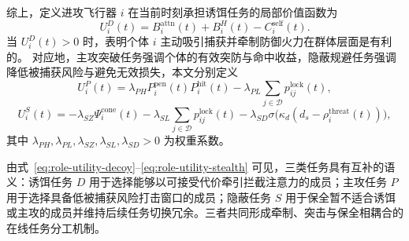 综上，定义进攻飞行器 $i$ 在当前时刻承担诱饵任务的局部价值函数为
\begin{equation}
U_i^{D}(t)
=
B_i^{\mathrm{attn}}(t)
+
B_i^{H}(t)
-
C_i^{\mathrm{self}}(t).
\label{eq:role-utility-decoy}
\end{equation}
当 $U_i^{D}(t)>0$ 时，表明个体 $i$ 主动吸引捕获并牵制防御火力在群体层面是有利的。
对应地，主攻突破任务强调个体的有效突防与命中收益，隐蔽规避任务强调降低被捕获风险与避免无效损失，本文分别定义
\begin{equation}
U_i^{P}(t)
=
\lambda_{PH}P_i^{\mathrm{pen}}(t)P_i^{\mathrm{hit}}(t)
-
\lambda_{PL}\sum_{j\in\mathcal D}p_{ij}^{\mathrm{lock}}(t),
\label{eq:role-utility-pen}
\end{equation}
\begin{equation}
U_i^{S}(t)
=
-\lambda_{SZ}\Psi_i^{\mathrm{cone}}(t)
-
\lambda_{SL}\sum_{j\in\mathcal D}p_{ij}^{\mathrm{lock}}(t)
-
\lambda_{SD}\sigma\!\bigl(\kappa_d(d_s-\rho_i^{\mathrm{threat}}(t))\bigr),
\label{eq:role-utility-stealth}
\end{equation}
其中 $\lambda_{PH},\lambda_{PL},\lambda_{SZ},\lambda_{SL},\lambda_{SD}>0$ 为权重系数。

由式~\eqref{eq:role-utility-decoy}--\eqref{eq:role-utility-stealth} 可见，三类任务具有互补的语义：诱饵任务 $D$ 用于选择能够以可接受代价牵引拦截注意力的成员；主攻任务 $P$ 用于选择具备低被捕获风险打击窗口的成员；隐蔽任务 $S$ 用于保全暂不适合诱饵或主攻的成员并维持后续任务切换冗余。三者共同形成牵制、突击与保全相耦合的在线任务分工机制。

